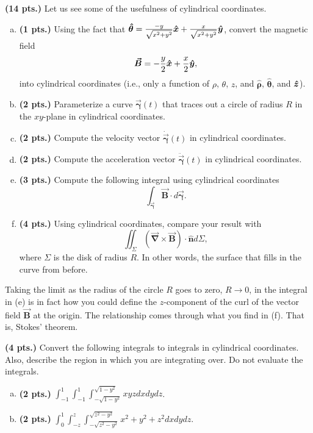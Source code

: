 \documentclass[12pt]{article} %
\newcommand{\grad}{\boldsymbol{\vec{\nabla}}}
\newcommand{\curvegamma}{\boldsymbol{\vec{\gamma}}}
\newcommand{\tangentgamma}{\boldsymbol{\dot{\vec{\gamma}}}}
\newcommand{\normalgamma}{\boldsymbol{\ddot{\vec{\gamma}}}}
\newcommand{\thetahat}{\boldsymbol{\hat{\theta}}}
\newcommand{\rhohat}{\boldsymbol{\hat{\rho}}}
\newcommand{\unitvec}{\boldsymbol{\hat{n}}}
\newcommand{\vecfieldB}{\boldsymbol{\vec{B}}}
\begin{document}
\begin{problem}
	\textbf{(14 pts.)} Let us see some of the usefulness of cylindrical coordinates.
	\begin{enumerate}[(a)]
		\item \textbf{(1 pts.)} Using the fact that $\thetahat = \frac{-y}{\sqrt{x^2+y^2}}\xhat + \frac{x}{\sqrt{x^2+y^2}}\yhat$, convert the magnetic field 
		\[
		\vecfieldB = -\frac{y}{2}\xhat + \frac{x}{2}\yhat,
		\]
		into cylindrical coordinates (i.e., only a function of $\rho$, $\theta$, $z$, and $\rhohat$, $\thetahat$, and $\boldsymbol{\hat{z}}$).  
		\item \textbf{(2 pts.)} Parameterize a curve $\curvegamma(t)$ that traces out a circle of radius $R$ in the $xy$-plane in cylindrical coordinates.
		\item \textbf{(2 pts.)} Compute the velocity vector $\tangentgamma(t)$ in cylindrical coordinates.
		\item \textbf{(2 pts.)} Compute the acceleration vector $\normalgamma(t)$ in cylindrical coordinates.
		\item \textbf{(3 pts.)} Compute the following integral using cylindrical coordinates
		\[
		\int_{\curvegamma} \vecfieldB \cdot d\curvegamma.
		\]
		        \item \textbf{(4 pts.)} Using cylindrical coordinates, compare your result with
		        \[
		        \iint_\Sigma \left(\grad \times \vecfieldB\right) \cdot \unitvec d\Sigma,
		        \]
		        where $\Sigma$ is the disk of radius $R$. In other words, the surface that fills in the curve from before.
	\end{enumerate}
\begin{remark}
	Taking the limit as the radius of the circle $R$ goes to zero, $R \to 0$, in the integral in (e) is in fact how you could define the $z$-component of the curl of the vector field $\vecfieldB$ at the origin. The relationship comes through what you find in (f). That is, Stokes' theorem.
	\end{remark}
\end{problem}

\vspace*{.5cm}

\begin{problem}
	\textbf{(4 pts.)} Convert the following integrals to integrals in cylindrical coordinates. Also, describe the region in which you are integrating over. Do not evaluate the integrals.
	\begin{enumerate}[(a)]
		\item \textbf{(2 pts.)} $\displaystyle{\int_{-1}^{1} \int_{-1}^{1} \int_{-\sqrt{1-y^2}}^{\sqrt{1-y^2}} xyz dxdydz}$.
		\item \textbf{(2 pts.)} $\displaystyle{\int_0^1 \int_{-z}^z \int_{-\sqrt{z^2-y^2}}^{\sqrt{z^2-y^2}} x^2+y^2+z^2 dxdydz}$.
	\end{enumerate}
\end{problem}
\end{document}
